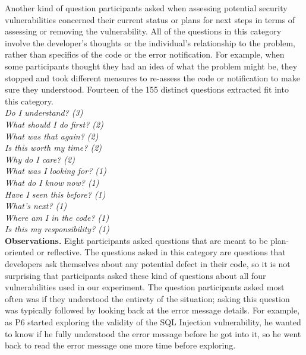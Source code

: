 \documentclass[conference]{IEEEtran}
\begin{document}
Another kind of question participants asked when assessing potential security vulnerabilities concerned their current status or plans for next steps in terms of assessing or removing the vulnerability. 
All of the questions in this category involve the developer's thoughts or the individual's relationship to the problem, rather than specifics of the code or the error notification.
For example, when some participants thought they had an idea of what the problem might be, they stopped and took different measures to re-assess the code or notification to make sure they understood.
Fourteen of the 155 distinct questions extracted fit into this category. 
\\

\noindent\emph{Do I understand? (3)} \\
\emph{What should I do first? (2)} \\
\emph{What was that again? (2)} \\
\emph{Is this worth my time? (2)} \\
\emph{Why do I care? (2)} \\
\emph{What was I looking for? (1)} \\
\emph{What do I know now? (1)} \\
\emph{Have I seen this before? (1)} \\
\emph{What's next? (1)} \\
\emph{Where am I in the code? (1)} \\
\emph{Is this my responsibility? (1)} \\



\noindent\textbf{Observations.}
Eight participants asked questions that are meant to be plan-oriented or reflective.
The questions asked in this category are questions that developers ask themselves about any potential defect in their code, so it is not surprising that participants asked these kind of questions about all four vulnerabilities used in our experiment.
The question participants asked most often was if they understood the entirety of the situation; asking this question was typically followed by looking back at the error message details. 
For example, as P6 started exploring the validity of the SQL Injection vulnerability, he wanted to know if he fully understood the error message before he got into it, so he went back to read the error message one more time before exploring.
\\
\end{document}
